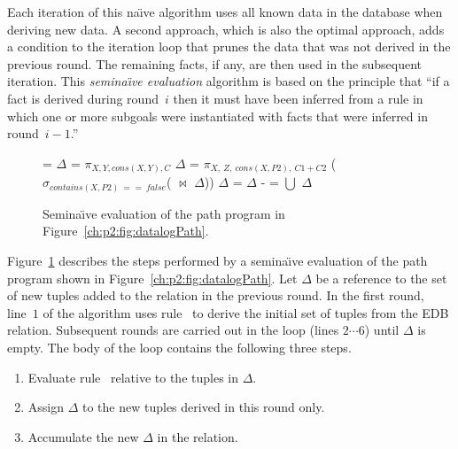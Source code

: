 Each iteration of this na\"{\i}ve algorithm uses all known data in the database
when deriving new data.  A second approach, which is also the optimal approach,
adds a condition to the iteration loop that prunes the data that was not
derived in the previous round.  The remaining facts, if any, are then used in
the subsequent iteration.  This {\em semina\"{\i}ve evaluation} algorithm is
based on the principle that ``if a fact is derived during round~$i$ then it
must have been inferred from a rule in which one or more subgoals were
instantiated with facts that were inferred in round~$i-1$.''~\cite{ullmanbook}


\begin{figure}
\ssp
\begin{boxedminipage}{\linewidth}
    \begin{algorithmic}[1]
      \STATE {} = $\Delta$ = $\pi_{X, Y, cons(X, Y), C}$
      	\STATE $\Delta$ = $\pi_{X,\ Z,\ cons(X, P2),\ C1+C2}$ 
      	($\sigma_{contains(X,P2)\ ==\ false}$( $\Join$ $\Delta$)) 
      	\STATE $\Delta$ = $\Delta$ - 
      	\STATE {} =  $\bigcup$ $\Delta$
      \ENDWHILE
    \end{algorithmic}
\end{boxedminipage}
\caption{\label{ch:p2:fig:seminaive}Semina\"{\i}ve evaluation of the 
path program in Figure~\ref{ch:p2:fig:datalogPath}.}
\end{figure}

Figure~\ref{ch:p2:fig:seminaive} describes the steps performed by a
semina\"{\i}ve evaluation of the path program shown in
Figure~\ref{ch:p2:fig:datalogPath}.  Let $\Delta$ be a reference to
the set of new tuples added to the  relation in the previous round.
In the first round, line~$1$ of the algorithm uses rule~ to derive the initial
set of  tuples from the EDB  relation.  Subsequent rounds are
carried out in the  loop (lines $2 \cdots 6$) until $\Delta$
is empty.  The body of the loop contains the following three steps.
\begin{enumerate} \ssp 
  \item Evaluate rule~ relative to the tuples in
    $\Delta$.  
  \item Assign $\Delta$ to the new tuples
    derived in this round only.  
  \item Accumulate the new $\Delta$ in the  relation.  
\end{enumerate}

